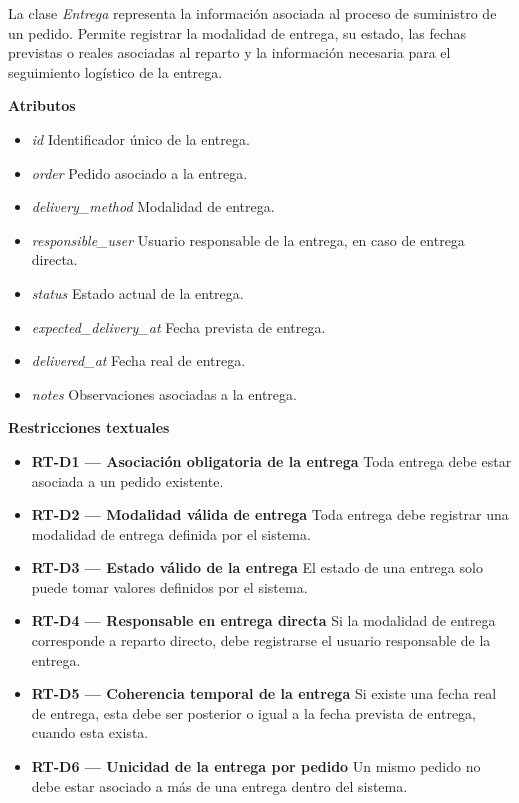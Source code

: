 La clase \textit{Entrega} representa la información asociada al proceso de suministro de un pedido. Permite registrar la modalidad de entrega, su estado, las fechas previstas o reales asociadas al reparto y la información necesaria para el seguimiento logístico de la entrega.

\textbf{Atributos}

\begin{itemize}
      \item \textit{id}
            Identificador único de la entrega.
      \item \textit{order}
            Pedido asociado a la entrega.
      \item \textit{delivery\_method}
            Modalidad de entrega.
      \item \textit{responsible\_user}
            Usuario responsable de la entrega, en caso de entrega directa.
      \item \textit{status}
            Estado actual de la entrega.
      \item \textit{expected\_delivery\_at}
            Fecha prevista de entrega.
      \item \textit{delivered\_at}
            Fecha real de entrega.
      \item \textit{notes}
            Observaciones asociadas a la entrega.
\end{itemize}

\textbf{Restricciones textuales}

\begin{itemize}
      \item \textbf{RT-D1 — Asociación obligatoria de la entrega}
            Toda entrega debe estar asociada a un pedido existente.
      \item \textbf{RT-D2 — Modalidad válida de entrega}
            Toda entrega debe registrar una modalidad de entrega definida por el sistema.
      \item \textbf{RT-D3 — Estado válido de la entrega}
            El estado de una entrega solo puede tomar valores definidos por el sistema.
      \item \textbf{RT-D4 — Responsable en entrega directa}
            Si la modalidad de entrega corresponde a reparto directo, debe registrarse el usuario responsable de la entrega.
      \item \textbf{RT-D5 — Coherencia temporal de la entrega}
            Si existe una fecha real de entrega, esta debe ser posterior o igual a la fecha prevista de entrega, cuando esta exista.
      \item \textbf{RT-D6 — Unicidad de la entrega por pedido}
            Un mismo pedido no debe estar asociado a más de una entrega dentro del sistema.
\end{itemize}

